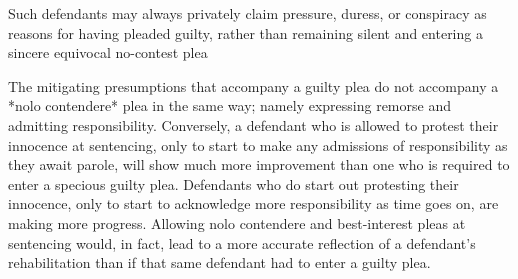 Such defendants may always privately claim pressure, duress, or conspiracy as reasons for having pleaded guilty, rather than remaining silent and entering a sincere equivocal no-contest plea

The mitigating presumptions that accompany a guilty plea do not accompany a *nolo contendere* plea in the same way; namely expressing remorse and admitting responsibility. Conversely, a defendant who is allowed to protest their innocence at sentencing, only to start to make any admissions of responsibility as they await parole, will show much more improvement than one who is required to enter a specious guilty plea. Defendants who do start out protesting their innocence, only to start to acknowledge more responsibility as time goes on, are making more progress. Allowing nolo contendere and best-interest pleas at sentencing would, in fact, lead to a more accurate reflection of a defendant's rehabilitation than if that same defendant had to enter a guilty plea.